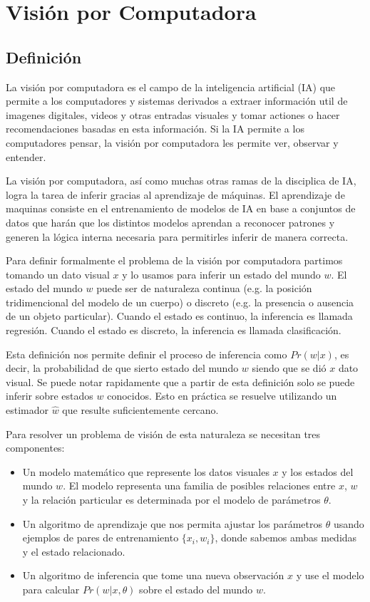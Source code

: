 \documentclass[letter,12pt]{report}
\begin{document}
\section{Visión por Computadora}
\subsection{Definición}
La visión por computadora es el campo de la inteligencia artificial (IA) que permite a
los computadores y sistemas derivados a extraer información util de imagenes digitales,
videos y otras entradas visuales y tomar actiones o hacer recomendaciones basadas en esta
información. Si la IA permite a los computadores pensar, la visión por computadora les
permite ver, observar y entender. %

La visión por computadora, así como muchas otras ramas de la disciplica de IA, logra la
tarea de inferir gracias al aprendizaje de máquinas. El aprendizaje de maquinas consiste
en el entrenamiento de modelos de IA en base a conjuntos de datos que harán que los
distintos modelos aprendan a reconocer patrones y generen la lógica interna necesaria
para permitirles inferir de manera correcta.

Para definir formalmente el problema de la visión por computadora partimos tomando un
dato visual $x$ y lo usamos para inferir un estado del mundo $w$. El estado del mundo $w$
puede ser de naturaleza continua (e.g. la posición tridimencional del modelo de un
cuerpo) o discreto (e.g. la presencia o ausencia de un objeto particular). Cuando el
estado es continuo, la inferencia es llamada regresión. Cuando el estado es discreto, la
inferencia es llamada clasificación. %

Esta definición nos permite definir el proceso de inferencia como $Pr(w|x)$, es decir, la
probabilidad de que sierto estado del mundo $w$ siendo que se dió $x$ dato visual. Se
puede notar rapidamente que a partir de esta definición solo se puede inferir sobre
estados $w$ conocidos. Esto en práctica se resuelve utilizando un estimador $\hat{w}$ que
resulte suficientemente cercano.

Para resolver un problema de visión de esta naturaleza se necesitan tres componentes:
\begin{itemize}
    \item Un modelo matemático que represente los datos visuales $x$ y los estados del
        mundo $w$. El modelo representa una familia de posibles relaciones entre $x$, 
        $w$ y la relación particular es determinada por el modelo de parámetros $\theta$.
    \item Un algoritmo de aprendizaje que nos permita ajustar los parámetros $\theta$
        usando ejemplos de pares de entrenamiento $\{x_i, w_i\}$, donde sabemos ambas
        medidas y el estado relacionado.
    \item Un algoritmo de inferencia que tome una nueva observación $x$ y use el modelo
        para calcular $Pr(w|x, \theta)$ sobre el estado del mundo $w$.
\end{itemize}
\end{document}
